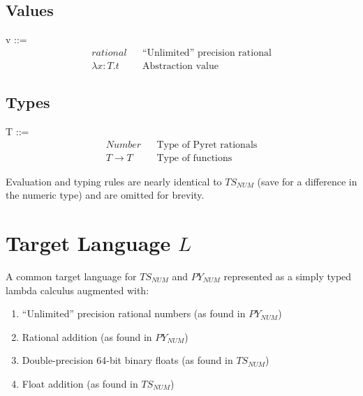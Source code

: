 \documentclass{article}
\begin{document}
	
	\subsection{Values}
	v ::=
	\begin{align*}
		rational							&& \text{``Unlimited'' precision rational} \\
		\lambda x \colon T.t						&& \text{Abstraction value}
	\end{align*}
	
	
	\subsection{Types}
	T ::=
	\begin{align*}
		Number												&& \text{Type of Pyret rationals}\\
		T \rightarrow T										&& \text{Type of functions}
	\end{align*}
		
	Evaluation and typing rules are nearly identical to $TS_{NUM}$ (save for a difference in the numeric type) and are omitted for brevity.


	\section{Target Language $L$}
	A common target language for $TS_{NUM}$ and $PY_{NUM}$ represented as a simply typed lambda calculus augmented with:
	\begin{enumerate}
		\item ``Unlimited'' precision rational numbers (as found in $PY_{NUM}$)
		\item Rational addition (as found in $PY_{NUM}$)
		\item Double-precision 64-bit binary floats (as found in $TS_{NUM}$)
		\item Float addition (as found in $TS_{NUM}$)
	\end{enumerate}
\end{document}
